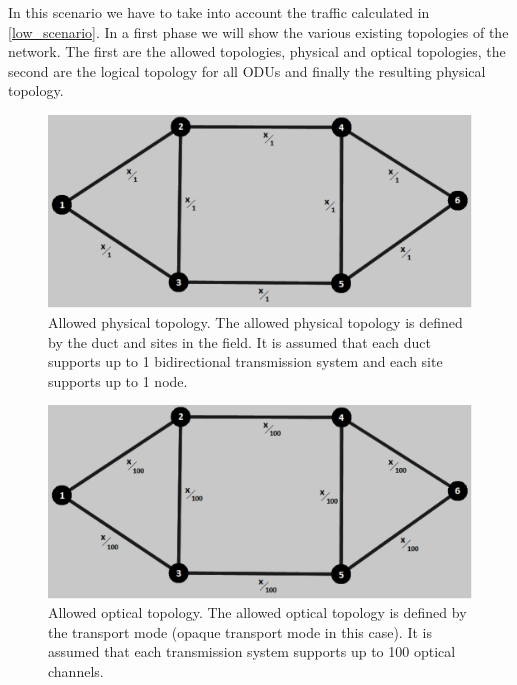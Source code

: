 In this scenario we have to take into account the traffic calculated in \ref{low_scenario}. In a first phase we will show the various existing topologies of the network. The first are the allowed topologies, physical and optical topologies, the second are the logical topology for all ODUs and finally the resulting physical topology.\\

\begin{figure}[H]
\centering
\includegraphics[width=13cm]{sdf/heuristic/opaque/figures/allowed_physical}
\caption{Allowed physical topology. The allowed physical topology is defined by the duct and sites in the field. It is assumed that each duct supports up to 1 bidirectional transmission system and each site supports up to 1 node.}
\label{allowed_physical_surv_ref_low_heuristic}
\end{figure}

\begin{figure}[H]
\centering
\includegraphics[width=13cm]{sdf/heuristic/opaque/figures/allowed_optical}
\caption{Allowed optical topology. The allowed optical topology is defined by the transport mode (opaque transport mode in this case). It is assumed that each transmission system supports up to 100 optical channels.}
\label{allowed_optical_surv_ref_low_heuristic}
\end{figure}

